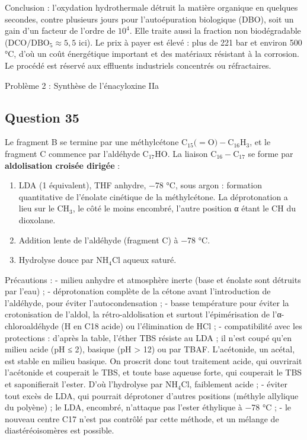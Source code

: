 \documentclass[11pt,a4paper]{article}
\providecommand{\tightlist}{\setlength{\itemsep}{0pt}\setlength{\parskip}{0pt}}
\begin{document}
Conclusion : l'oxydation hydrothermale détruit la matière organique en quelques secondes, contre plusieurs jours pour l'autoépuration biologique (DBO), soit un gain d'un facteur de l'ordre de \(10^4\). Elle traite aussi la fraction non biodégradable (\(\mathrm{DCO}/\mathrm{DBO_5}\approx5{,}5\) ici). Le prix à payer est élevé : plus de 221 bar et environ 500 °C, d'où un coût énergétique important et des matériaux résistant à la corrosion. Le procédé est réservé aux effluents industriels concentrés ou réfractaires.

Problème 2 : Synthèse de l'énacyloxine IIa

\hypertarget{question-35}{%
\subsection{Question 35}\label{question-35}}

Le fragment B se termine par une méthylcétone \(\mathrm{C_{15}(} = \mathrm{O){-}C_{16}H_3}\), et le fragment C commence par l'aldéhyde \(\mathrm{C_{17}HO}\). La liaison \(\mathrm{C_{16}{-}C_{17}}\) se forme par \textbf{aldolisation croisée dirigée} :

\begin{enumerate}
\def\labelenumi{\arabic{enumi}.}
\tightlist
\item
  LDA (1 équivalent), THF anhydre, −78 °C, sous argon : formation quantitative de l'énolate cinétique de la méthylcétone. La déprotonation a lieu sur le CH\(_3\), le côté le moins encombré, l'autre position α étant le CH du dioxolane.
\item
  Addition lente de l'aldéhyde (fragment C) à −78 °C.
\item
  Hydrolyse douce par NH\(_4\)Cl aqueux saturé.
\end{enumerate}

Précautions :
- milieu anhydre et atmosphère inerte (base et énolate sont détruits par l'eau) ;
- déprotonation complète de la cétone avant l'introduction de l'aldéhyde, pour éviter l'autocondensation ;
- basse température pour éviter la crotonisation de l'aldol, la rétro-aldolisation et surtout l'épimérisation de l'α-chloroaldéhyde (H en C18 acide) ou l'élimination de HCl ;
- compatibilité avec les protections : d'après la table, l'éther TBS résiste au LDA ; il n'est coupé qu'en milieu acide (pH ≤ 2), basique (pH \textgreater{} 12) ou par TBAF. L'acétonide, un acétal, est stable en milieu basique. On proscrit donc tout traitement acide, qui ouvrirait l'acétonide et couperait le TBS, et toute base aqueuse forte, qui couperait le TBS et saponifierait l'ester. D'où l'hydrolyse par NH\(_4\)Cl, faiblement acide ;
- éviter tout excès de LDA, qui pourrait déprotoner d'autres positions (méthyle allylique du polyène) ; le LDA, encombré, n'attaque pas l'ester éthylique à −78 °C ;
- le nouveau centre C17 n'est pas contrôlé par cette méthode, et un mélange de diastéréoisomères est possible.
\end{document}

